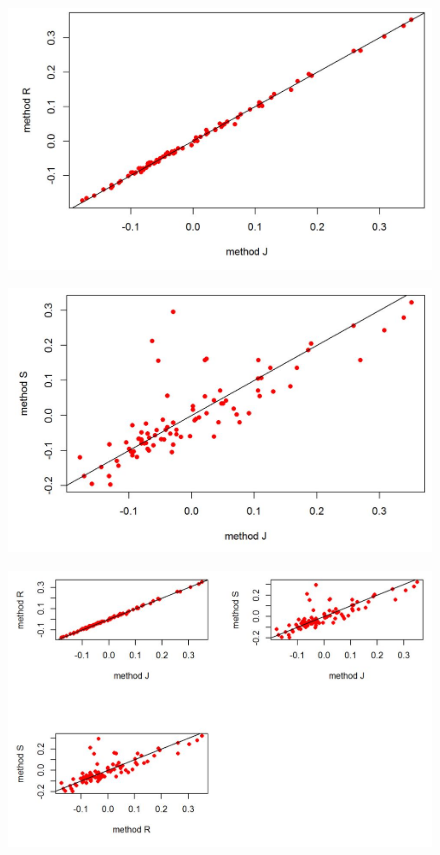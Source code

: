 \documentclass[compress]{beamer}        %
\begin{document}
\begin{frame}
	\begin{figure}
\centering
\includegraphics[width=0.99\linewidth]{images/plot1}
\end{figure}

\end{frame}
\begin{frame}
	\begin{figure}
		\centering
		\includegraphics[width=0.99\linewidth]{images/plot2}
	\end{figure}
	
\end{frame}
\begin{frame}
	\begin{figure}
		\centering
		\includegraphics[width=0.99\linewidth]{images/plot4}
	\end{figure}
	
\end{frame}
\end{document}
